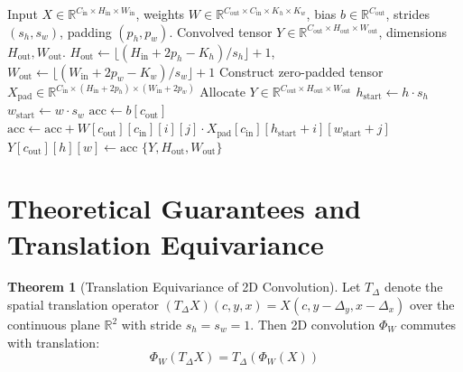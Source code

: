 \documentclass[11pt,a4paper]{article}
\theoremstyle{definition}
\newtheorem{theorem}{Theorem}[section]
\begin{document}
\begin{algorithm}[H]
\caption{2D Discrete Cross-Correlation Convolution Forward Pass}
\label{alg:conv2d}
\begin{algorithmic}[1]
\Require Input $X \in \mathbb{R}^{C_{\text{in}} \times H_{\text{in}} \times W_{\text{in}}}$, weights $W \in \mathbb{R}^{C_{\text{out}} \times C_{\text{in}} \times K_h \times K_w}$, bias $b \in \mathbb{R}^{C_{\text{out}}}$, strides $(s_h, s_w)$, padding $(p_h, p_w)$.
\Ensure Convolved tensor $Y \in \mathbb{R}^{C_{\text{out}} \times H_{\text{out}} \times W_{\text{out}}}$, dimensions $H_{\text{out}}, W_{\text{out}}$.
\State $H_{\text{out}} \gets \lfloor (H_{\text{in}} + 2p_h - K_h) / s_h \rfloor + 1$, $W_{\text{out}} \gets \lfloor (W_{\text{in}} + 2p_w - K_w) / s_w \rfloor + 1$
\State Construct zero-padded tensor $X_{\text{pad}} \in \mathbb{R}^{C_{\text{in}} \times (H_{\text{in}}+2p_h) \times (W_{\text{in}}+2p_w)}$
\State Allocate $Y \in \mathbb{R}^{C_{\text{out}} \times H_{\text{out}} \times W_{\text{out}}}$
        \State $h_{\text{start}} \gets h \cdot s_h$
            \State $w_{\text{start}} \gets w \cdot s_w$
            \State $\text{acc} \gets b[c_{\text{out}}]$
                        \State $\text{acc} \gets \text{acc} + W[c_{\text{out}}][c_{\text{in}}][i][j] \cdot X_{\text{pad}}[c_{\text{in}}][h_{\text{start}} + i][w_{\text{start}} + j]$
                    \EndFor
                \EndFor
            \EndFor
            \State $Y[c_{\text{out}}][h][w] \gets \text{acc}$
        \EndFor
    \EndFor
\EndFor
\State \Return $\{Y, H_{\text{out}}, W_{\text{out}}\}$
\end{algorithmic}
\end{algorithm}

\section{Theoretical Guarantees and Translation Equivariance}

\begin{theorem}[Translation Equivariance of 2D Convolution]
Let $T_{\Delta}$ denote the spatial translation operator $(T_{\Delta} X)(c, y, x) = X(c, y - \Delta_y, x - \Delta_x)$ over the continuous plane $\mathbb{R}^2$ with stride $s_h = s_w = 1$. Then 2D convolution $\Phi_W$ commutes with translation:
\begin{equation}
\Phi_W(T_{\Delta} X) = T_{\Delta}(\Phi_W(X))
\end{equation}
\end{theorem}
\end{document}
